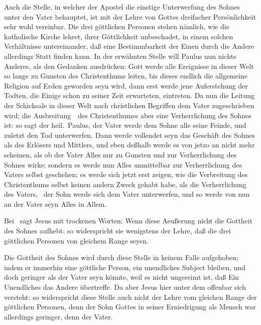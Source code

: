 \begin{aufzb}
\item Auch die Stelle, in welcher der Apostel die einstige Unterwerfung des Sohnes unter den Vater behauptet, ist mit der Lehre von Gottes dreifacher Persönlichkeit sehr wohl vereinbar. Die drei göttlichen Personen stehen nämlich, wie die katholische Kirche lehret, ihrer Göttlichkeit unbeschadet, in einem solchen Verhältnisse untereinander, daß eine Bestimmbarkeit der Einen durch die Andere allerdings Statt finden kann. In der erwähnten Stelle will Paulus nun nichts Anderes, als den Gedanken ausdrücken: Gott werde alle Ereignisse in dieser Welt so lange zu Gunsten des Christenthums leiten, bis dieses endlich die allgemeine Religion auf Erden geworden seyn wird, dann erst werde jene Auferstehung der Todten, die Einige schon zu seiner Zeit erwarteten, eintreten. Da nun die Leitung der Schicksale in dieser Welt nach christlichen Begriffen dem Vater zugeschrieben wird; die Ausbreitung~\ des Christenthumes aber eine Verherrlichung des Sohnes ist: so sagt der heil.\ Paulus, der Vater werde dem Sohne alle seine Feinde, und zuletzt den Tod unterwerfen. Dann werde vollendet seyn das Geschäft des Sohnes als des Erlösers und Mittlers, und eben deßhalb werde es von jetzo an nicht mehr scheinen, als ob der Vater Alles nur zu Gunsten und zur Verherrlichung des Sohnes wirke; sondern es werde nun Alles unmittelbar zur Verherrlichung des Vaters selbst geschehen; es werde sich jetzt erst zeigen, wie die Verbreitung des Christenthums selbst keinen andern Zweck gehabt habe, als die Verherrlichung des Vaters, \dh\ der Sohn werde sich dem Vater unterwerfen, und so werde von nun an der Vater seyn Alles in Allem.
\end{aufzb}\par
{} Bei \ sagt Jesus mit trockenen Worten:  Wenn diese Aeußerung nicht die Gottheit des Sohnes aufhebt: so widerspricht sie wenigstens der Lehre, daß die drei göttlichen Personen von gleichem Range seyen.\par
{} Die Gottheit des Sohnes wird durch diese Stelle in keinem Falle aufgehoben; indem er immerhin eine göttliche Person, ein unendliches Subject bleiben, und doch geringer als der Vater seyn könnte, weil es nicht ungereimt ist, daß Ein Unendliches das Andere übertreffe. Da aber Jesus hier unter dem  offenbar sich  versteht: so widerspricht diese Stelle auch nicht der Lehre vom gleichen Range der göttlichen Personen, denn der Sohn Gottes in seiner Erniedrigung als Mensch war allerdings geringer, denn der Vater.\par
